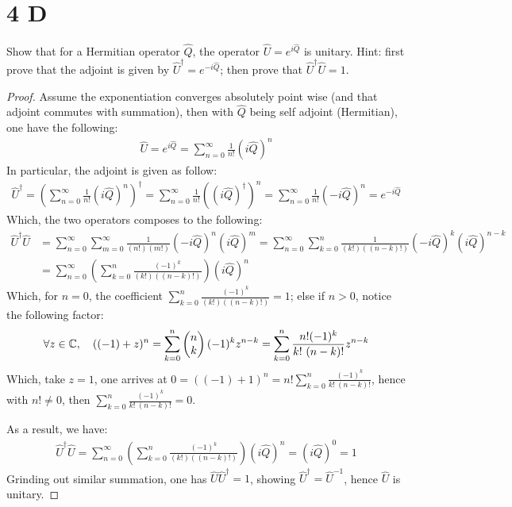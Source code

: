 \documentclass{article}
\begin{document}
\newpage

\section*{4 D}

\begin{ques}
Show that for a Hermitian operator $\hat Q$, the operator $\hat U = e^{i\hat Q}$ is unitary. Hint: first prove
that the adjoint is given by $\hat U^\dagger = e^{-i\hat Q}$; then prove that $\hat U^\dagger \hat U = 1$.
\end{ques}

\begin{proof}
    Assume the exponentiation converges absolutely point wise (and that adjoint commutes with summation), then with $\hat{Q}$ being self adjoint (Hermitian), one have the following:
    \begin{align}
        \hat{U} = e^{i\hat{Q}} = \sum_{n=0}^\infty\frac{1}{n!}(i\hat{Q})^n
    \end{align}
    In particular, the adjoint is given as follow:
    \begin{align}
        \hat{U}^\dagger = \left(\sum_{n=0}^\infty\frac{1}{n!}(i\hat{Q})^n\right)^\dagger = \sum_{n=0}^\infty\frac{1}{n!}((i\hat{Q})^\dagger)^n = \sum_{n=0}^\infty \frac{1}{n!}(-i\hat{Q})^n = e^{-i\hat{Q}}
    \end{align}
    Which, the two operators composes to the following:
    \begin{align}
        \hat{U}^\dagger\hat{U} &= \sum_{n=0}^\infty \sum_{m=0}^\infty\frac{1}{(n!)(m!)}(-i\hat{Q})^n(i\hat{Q})^m = \sum_{n=0}^\infty\sum_{k=0}^n\frac{1}{(k!)((n-k)!)}(-i\hat{Q})^k(i\hat{Q})^{n-k}\\
        &= \sum_{n=0}^\infty \left(\sum_{k=0}^n\frac{(-1)^k}{(k!)((n-k)!)}\right)(i\hat{Q})^n
    \end{align}
    Which, for $n=0$, the coefficient $\sum_{k=0}^n\frac{(-1)^k}{(k!)((n-k)!)}=1$; else if $n>0$, notice the following factor:
    \begin{align}
        \forall z\in\CC,\quad ((-1)+z)^n = \sum_{k=0}^{n}\begin{pmatrix}
            n\\k
        \end{pmatrix}(-1)^k z^{n-k} = \sum_{k=0}^{n}\frac{n!(-1)^k}{k!\ (n-k)!}z^{n-k}
    \end{align} 
    Which, take $z=1$, one arrives at $0 = ((-1)+1)^n = n!\sum_{k=0}^{n}\frac{(-1)^k}{k!\ (n-k)!}$, hence with $n!\neq 0$, then $\sum_{k=0}^{n}\frac{(-1)^k}{k!\ (n-k)!}=0$.

    As a result, we have:
    \begin{align}
        \hat{U}^\dagger\hat{U}= \sum_{n=0}^\infty \left(\sum_{k=0}^n\frac{(-1)^k}{(k!)((n-k)!)}\right)(i\hat{Q})^n = (i\hat{Q})^0 = 1
    \end{align}
    Grinding out similar summation, one has $\hat{U}\hat{U}^\dagger = 1$, showing $\hat{U}^\dagger = \hat{U}^{-1}$, hence $\hat{U}$ is unitary.
\end{proof}
\end{document}
